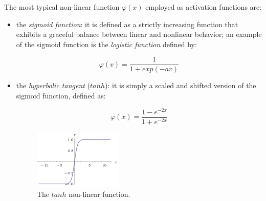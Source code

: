 
The most typical non-linear function $\varphi(x)$ employed as activation functions are:
\begin{itemize}
\item the \textit{sigmoid function}: it is defined as a strictly increasing function that exhibits a graceful balance between linear and nonlinear behavior; an example of the sigmoid function is the \textit{logistic function} defined by:

\begin{equation}
\varphi \left( v \right) =\frac { 1 }{ 1+exp\left( -av \right)  } 
\end{equation}

\item the \textit{ hyperbolic tangent } ($tanh$): it is simply a scaled and shifted version of the sigmoid function, defined as:

\begin{equation}
\varphi(x) = \frac{1-e^{-2x}}{1+e^{-2x}}
\end{equation}

\begin{figure}[h]
\centering
\includegraphics[width=0.4\textwidth]{img/tanh}
\caption{The $tanh$ non-linear function.}
\end{figure}


\end{itemize}
